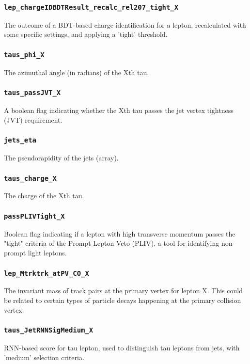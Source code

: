 \subsubsection{\texttt{lep\_chargeIDBDTResult\_recalc\_rel207\_tight\_X}} The outcome of a BDT-based charge identification
for a lepton, recalculated with some specific settings, and applying a 'tight' threshold.

\subsubsection{\texttt{taus\_phi\_X}} The azimuthal angle (in radians) of the Xth tau.

\subsubsection{\texttt{taus\_passJVT\_X}} A boolean flag indicating whether the Xth tau passes the jet vertex tightness
(JVT) requirement.

\subsubsection{\texttt{jets\_eta}} The pseudorapidity of the jets (array).

\subsubsection{\texttt{taus\_charge\_X}} The charge of the Xth tau.

\subsubsection{\texttt{passPLIVTight\_X}} Boolean flag indicating if a lepton with high transverse momentum passes the
"tight" criteria of the Prompt Lepton Veto (PLIV), a tool for identifying non-prompt light leptons.

\subsubsection{\texttt{lep\_Mtrktrk\_atPV\_CO\_X}} The invariant mass of track pairs at the primary vertex for lepton X.
This could be related to certain types of particle decays happening at the primary collision vertex.

\subsubsection{\texttt{taus\_JetRNNSigMedium\_X}} RNN-based score for tau lepton, used to distinguish tau leptons from
jets, with 'medium' selection criteria.

